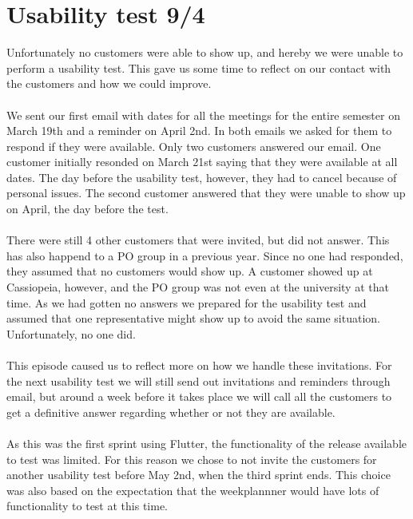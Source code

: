\section{Usability test 9/4}
Unfortunately no customers were able to show up, and hereby we were unable to perform a usability test.
This gave us some time to reflect on our contact with the customers and how we could improve.
\\\\
We sent our first email with dates for all the meetings for the entire semester on March 19th and a reminder on April 2nd.
In both emails we asked for them to respond if they were available. 
Only two customers answered our email. 
One customer initially resonded on March 21st saying that they were available at all dates. 
The day before the usability test, however, they had to cancel because of personal issues.
The second customer answered that they were unable to show up on April, the day before the test.
\\\\
There were still 4 other customers that were invited, but did not answer.
This has also happend to a PO group in a previous year.
Since no one had responded, they assumed that no customers would show up.
A customer showed up at Cassiopeia, however, and the PO group was not even at the university at that time. 
As we had gotten no answers we prepared for the usability test and assumed that one representative might show up to avoid the same situation.
Unfortunately, no one did.
\\\\
This episode caused us to reflect more on how we handle these invitations.
For the next usability test we will still send out invitations and reminders through email, but around a week before it takes place we will call all the customers to get a definitive answer regarding whether or not they are available. 
\\\\
As this was the first sprint using Flutter, the functionality of the release available to test was limited. 
For this reason we chose to not invite the customers for another usability test before May 2nd, when the third sprint ends.
This choice was also based on the expectation that the weekplannner would have lots of functionality to test at this time.
